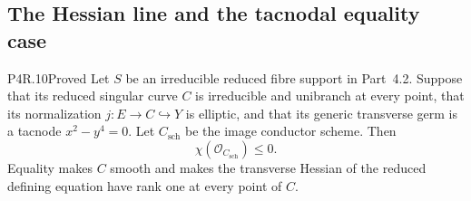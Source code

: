 \subsection{The Hessian line and the tacnodal equality case}

\begin{statement}{P4R.10}{Proved}
Let $S$ be an irreducible reduced fibre support in Part~4.2.
Suppose that its reduced singular curve $C$ is irreducible and
unibranch at every point, that its normalization $j:E\to C\hookrightarrow Y$
is elliptic, and that its generic transverse germ is a tacnode
$x^2-y^4=0$. Let $C_{\mathrm{sch}}$ be the image conductor scheme.
Then
\[
 \chi(\mathcal O_{C_{\mathrm{sch}}})\leq0.
\]
Equality makes $C$ smooth and makes the transverse Hessian of
the reduced defining equation have rank one at every point of $C$.
\end{statement}
